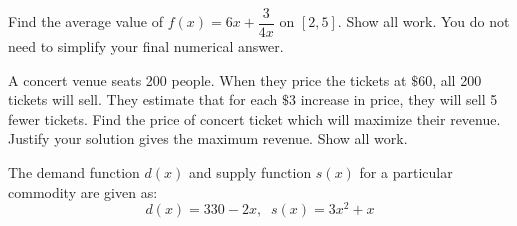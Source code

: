\documentclass[addpoints,12pt]{exam}
\begin{document}
\begin{questions}
\begin{parts}
\begin{minipage}{.5\textwidth}

\end{minipage}
\vfill

\end{parts}

\newpage

\question[8] Find the average value of $f(x)=6x+\dfrac{3}{4x}$ on $[2,5]$. Show all work. You do
not need to simplify your final numerical answer.

\newpage

\question[8]
A concert venue seats 200 people. When they price the tickets at $\$60$, all 200 tickets will sell.
They estimate that for each $\$3$ increase in price, they will sell 5 fewer tickets. Find the price
of concert ticket which will maximize their revenue. Justify your solution gives the maximum
revenue. Show all work.




\newpage




\question The demand function $d(x)$ and supply function $s(x)$ for a particular commodity are
given as:
$$d(x)=330-2x, \; \; s(x)=3x^2+x$$
\end{questions}
\end{document}
